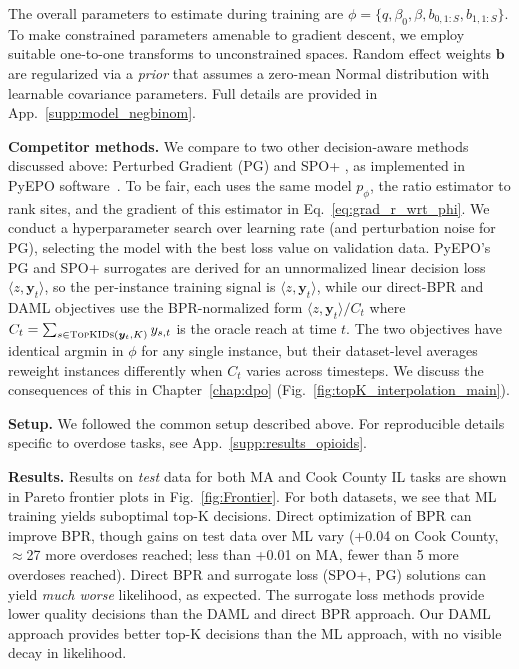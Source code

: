 

The overall parameters to estimate during training are $\phi = \{q, \beta_0, \beta, b_{0,1:S}, b_{1,1:S} \}$. To make constrained parameters amenable to gradient descent, we employ suitable one-to-one transforms to unconstrained spaces. Random effect weights $\bm{b}$ are regularized via a \emph{prior} that assumes a zero-mean Normal distribution with learnable covariance parameters. Full details are provided in App.~\ref{supp:model_negbinom}.

\textbf{Competitor methods.}
We compare to two other decision-aware methods discussed above: Perturbed Gradient (PG) \citep{huang_decision-focused_2024} and SPO+ \citep{elmachtoubSmartPredictThen2022}, as implemented in  PyEPO software~\citep{tang_pyepo_2023}. To be fair, each uses the same model $p_{\phi}$, the ratio estimator to rank sites, and the gradient of this estimator in Eq.~\eqref{eq:grad_r_wrt_phi}. We conduct a hyperparameter search over learning rate (and perturbation noise for PG), selecting the model with the best loss value on validation data. PyEPO's PG and SPO+ surrogates are derived for an unnormalized linear decision loss $\langle z, \bm{y}_t\rangle$, so the per-instance training signal is $\langle z, \bm{y}_t\rangle$, while our direct-BPR and DAML objectives use the BPR-normalized form $\langle z, \bm{y}_t\rangle / C_t$ where $C_t = \sum_{s \in \textsc{TopKIDs}(\bm{y}_t, K)} y_{s,t}$ is the oracle reach at time $t$. The two objectives have identical argmin in $\phi$ for any single instance, but their dataset-level averages reweight instances differently when $C_t$ varies across timesteps. We discuss the consequences of this in Chapter~\ref{chap:dpo} (Fig.~\ref{fig:topK_interpolation_main}).


\textbf{Setup.} We followed the common setup described above.
For reproducible details specific to overdose tasks, see App.~\ref{supp:results_opioids}.


\textbf{Results.}
Results on \emph{test} data for both MA and Cook County IL tasks are shown in Pareto frontier plots in Fig.~\ref{fig:Frontier}. For both datasets, we see that ML training yields suboptimal top-K decisions. Direct optimization of BPR can improve BPR, though gains on test data over ML vary (+0.04 on Cook County, $\approx$27 more overdoses reached; less than +0.01 on MA, fewer than 5 more overdoses reached).
Direct BPR and surrogate loss (SPO+, PG) solutions can yield \emph{much worse} likelihood, as expected. The surrogate loss methods provide lower quality decisions than the DAML and direct BPR approach.
Our DAML approach provides better top-K decisions than the ML approach, with no visible decay in likelihood. 
